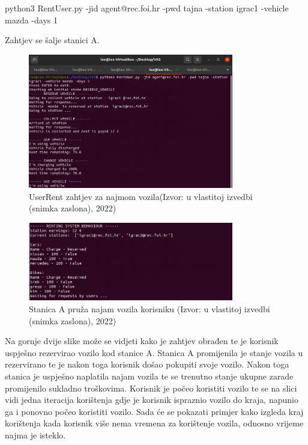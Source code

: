 \documentclass{foi}
\begin{document}
python3 RentUser.py -jid agent@rec.foi.hr -pwd tajna -station igrac1 -vehicle mazda -days 1

Zahtjev se šalje stanici A.

\pagebreak

\begin{figure}[H]
	\centering
	\includegraphics[width=0.8\textwidth]{slike/vas7}
	\caption{UserRent zahtjev za najmom vozila(Izvor: u vlastitoj izvedbi (snimka zaslona), 2022)}
\end{figure}

\begin{figure}[H]
	\centering
	\includegraphics[width=0.8\textwidth]{slike/vas8}
	\caption{Stanica A pruža najam vozila korisniku (Izvor: u vlastitoj izvedbi (snimka zaslona), 2022)}
\end{figure}

Na gornje dvije slike može se vidjeti kako je zahtjev obrađen te je korisnik uspješno rezervirao vozilo kod stanice A. Stanica A promijenila je stanje vozila u rezervirano te je nakon toga korisnik došao pokupiti svoje vozilo. Nakon toga stanica je uspješno naplatila najam vozila te se trenutno stanje ukupne zarade promijenilo sukladno troškovima. Korisnik je počeo koristiti vozilo te se na slici vidi jedna iteracija korištenja gdje je korisnik ispraznio vozilo do kraja, napunio ga i ponovno počeo koristiti vozilo. Sada će se pokazati primjer kako izgleda kraj korištenja kada korisnik više nema vremena za korištenje vozila, odnosno vrijeme najma je isteklo.
\end{document}
